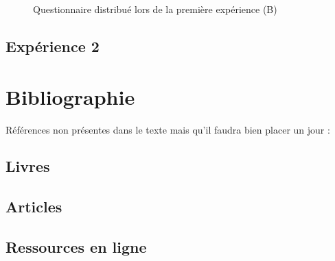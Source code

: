 \documentclass[12pt,fleqn,oneside]{book} %
\begin{document}
\newpage
\begin{figure}[htp] 
	\caption{Questionnaire distribué lors de la première expérience (B)}
\end{figure}

\newpage
\section*{Expérience 2}



\chapter{Bibliographie}
\begin{remark}
	Références non présentes dans le texte mais qu'il faudra bien placer un jour : \cite{ref1} \cite{vidnul} \cite{vidcool} \cite{imgtitre} \cite{imgheader1}
\end{remark}
\section*{Livres}
\printbibliography[heading=bibempty,type=book]
\section*{Articles}
\printbibliography[heading=bibempty,type=article]
\section*{Ressources en ligne}
\printbibliography[heading=bibempty,type=online]
\end{document}
